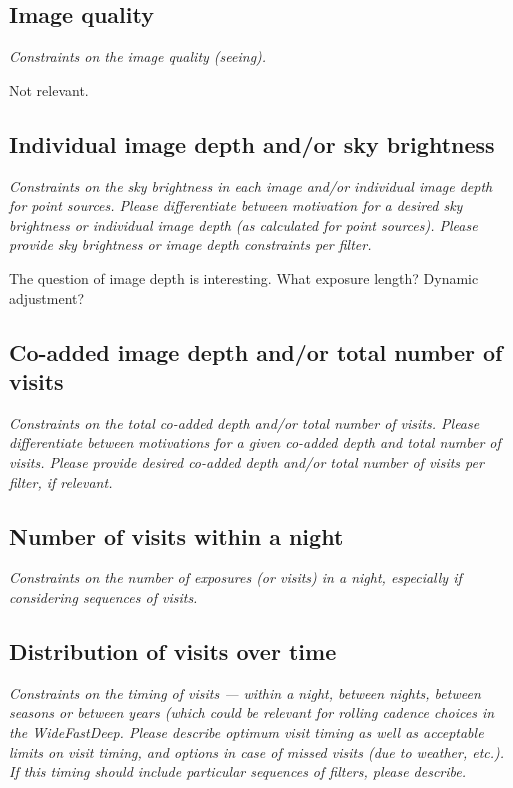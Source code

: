 \documentclass[11pt]{article}
\begin{document}
\subsection{Image quality}
\begin{footnotesize}{\it Constraints on the image quality (seeing).}\end{footnotesize}

Not relevant.

\subsection{Individual image depth and/or sky brightness}
\begin{footnotesize}{\it Constraints on the sky brightness in each image and/or individual image depth for point sources.
Please differentiate between motivation for a desired sky brightness or individual image depth (as 
calculated for point sources). Please provide sky brightness or image depth constraints per filter.}
\end{footnotesize}

The question of image depth is interesting.  What exposure length?
Dynamic adjustment?  


\subsection{Co-added image depth and/or total number of visits}
\begin{footnotesize}{\it  Constraints on the total co-added depth and/or total number of visits.
Please differentiate between motivations for a given co-added depth and total number of visits. 
Please provide desired co-added depth and/or total number of visits per filter, if relevant.}
\end{footnotesize}

\subsection{Number of visits within a night}
\begin{footnotesize}{\it Constraints on the number of exposures (or visits) in a night, especially if considering sequences of visits.  }
\end{footnotesize}

\subsection{Distribution of visits over time}
\begin{footnotesize}{\it Constraints on the timing of visits --- within a night, between nights, between seasons or
between years (which could be relevant for rolling cadence choices in the WideFastDeep. 
Please describe optimum visit timing as well as acceptable limits on visit timing, and options in
case of missed visits (due to weather, etc.). If this timing should include particular sequences
of filters, please describe.}
\end{footnotesize}
\end{document}
